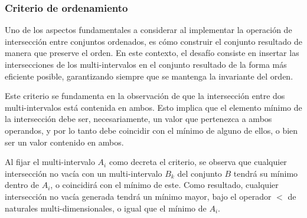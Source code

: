 \subsubsection{Criterio de ordenamiento}

Uno de los aspectos fundamentales a considerar al implementar la operación de intersección entre conjuntos ordenados, es cómo construir el conjunto resultado de manera que preserve el orden. En este contexto, el desafío consiste en insertar las intersecciones de los multi-intervalos en el conjunto resultado de la forma más eficiente posible, garantizando siempre que se mantenga la invariante del orden.

\begin{center}
\end{center}


Este criterio se fundamenta en la observación de que la intersección entre dos multi-intervalos está contenida en ambos. Esto implica que el elemento mínimo de la intersección debe ser, necesariamente, un valor que pertenezca a ambos operandos, y por lo tanto debe coincidir con el mínimo de alguno de ellos, o bien ser un valor contenido en ambos.

Al fijar el multi-intervalo $A_i$ como decreta el criterio, se observa que cualquier intersección no vacía con un multi-intervalo $B_k$ del conjunto $B$ tendrá su mínimo dentro de $A_i$, o coincidirá con el mínimo de este. Como resultado, cualquier intersección no vacía generada tendrá un mínimo mayor, bajo el operador $<$ de naturales multi-dimensionales, o igual que el mínimo de $A_i$.

